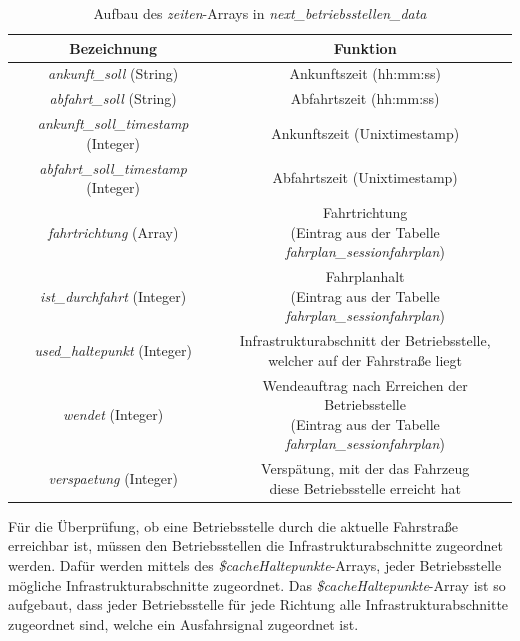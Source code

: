 \begin{table}
\begin{center}
\renewcommand{\arraystretch}{1.2}
\begin{tabular}{c|c}
Bezeichnung & Funktion \\ \hline
\textit{ankunft\_soll} (String)                  		&    Ankunftszeit (hh:mm:ss)                  \\ \hline
\textit{abfahrt\_soll} (String)                  		&     Abfahrtszeit (hh:mm:ss)                 \\ \hline
\textit{ankunft\_soll\_timestamp} (Integer)             	&   Ankunftszeit (Unixtimestamp)              \\ \hline
\textit{abfahrt\_soll\_timestamp} (Integer)             	&    Abfahrtszeit (Unixtimestamp)             \\ \hline
\textit{fahrtrichtung} (Array)                  		&   \makecell{Fahrtrichtung\\(Eintrag aus der Tabelle \textit{fahrplan\_sessionfahrplan})}                  \\ \hline
\textit{ist\_durchfahrt} (Integer)             	&    \makecell{Fahrplanhalt\\(Eintrag aus der Tabelle \textit{fahrplan\_sessionfahrplan})}               \\ \hline
\textit{used\_haltepunkt} (Integer)             	&    \makecell{Infrastrukturabschnitt der Betriebsstelle,\\welcher auf der Fahrstraße liegt}             \\ \hline
\textit{wendet} (Integer)             	&    \makecell{Wendeauftrag nach Erreichen der Betriebsstelle\\(Eintrag aus der Tabelle \textit{fahrplan\_sessionfahrplan})}                \\ \hline
\textit{verspaetung} (Integer)             	&    \makecell{Verspätung, mit der das Fahrzeug\\diese Betriebsstelle erreicht hat}               \\ 
\end{tabular}
\renewcommand{\arraystretch}{1}
\caption{Aufbau des \textit{zeiten}-Arrays in \textit{next\_betriebsstellen\_data}}
\label{table:betriebsstellenzeiten}
\end{center}
\end{table}
Für die Überprüfung, ob eine Betriebsstelle durch die aktuelle Fahrstraße erreichbar ist, müssen den Betriebsstellen die Infrastrukturabschnitte zugeordnet werden. Dafür werden mittels des \textit{\$cacheHaltepunkte}-Arrays, jeder Betriebsstelle mögliche Infrastrukturabschnitte zugeordnet. Das \textit{\$cacheHaltepunkte}-Array ist so aufgebaut, dass jeder Betriebsstelle für jede Richtung alle Infrastrukturabschnitte zugeordnet sind, welche ein Ausfahrsignal zugeordnet ist.
